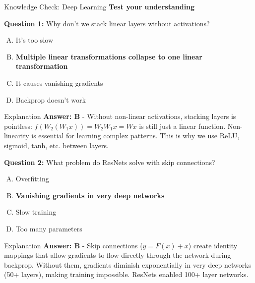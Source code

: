 \begin{frame}{Knowledge Check: Deep Learning}
\textbf{Test your understanding}

\vspace{0.2cm}

\textbf{Question 1:} Why don't we stack linear layers without activations?

\begin{enumerate}[A)]
\item It's too slow
\item \textcolor{forest}{\textbf{Multiple linear transformations collapse to one linear transformation}}
\item It causes vanishing gradients
\item Backprop doesn't work
\end{enumerate}

\pause

\begin{block}{Explanation}
\textcolor{forest}{\textbf{Answer: B}} - Without non-linear activations, stacking layers is pointless: $f(W_2(W_1 x)) = W_2 W_1 x = Wx$ is still just a linear function. Non-linearity is essential for learning complex patterns. This is why we use ReLU, sigmoid, tanh, etc. between layers.
\end{block}

\pause

\vspace{0.2cm}

\textbf{Question 2:} What problem do ResNets solve with skip connections?

\begin{enumerate}[A)]
\item Overfitting
\item \textcolor{forest}{\textbf{Vanishing gradients in very deep networks}}
\item Slow training
\item Too many parameters
\end{enumerate}

\pause

\begin{block}{Explanation}
\textcolor{forest}{\textbf{Answer: B}} - Skip connections ($y = F(x) + x$) create identity mappings that allow gradients to flow directly through the network during backprop. Without them, gradients diminish exponentially in very deep networks (50+ layers), making training impossible. ResNets enabled 100+ layer networks.
\end{block}
\end{frame}

